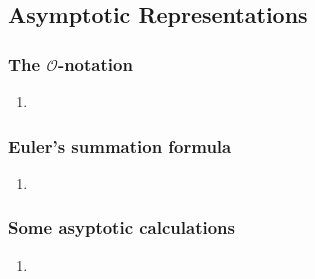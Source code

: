\documentclass[Main.tex]{subfiles}
\begin{document}
\subsection{Asymptotic Representations}
\subsubsection{The $\mathcal{O}$-notation}
\begin{enumerate}
    \item 
\end{enumerate}
\subsubsection{Euler's summation formula}
\begin{enumerate}
    \item 
\end{enumerate}
\subsubsection{Some asyptotic calculations}
\begin{enumerate}
    \item 
\end{enumerate}
\end{document}

